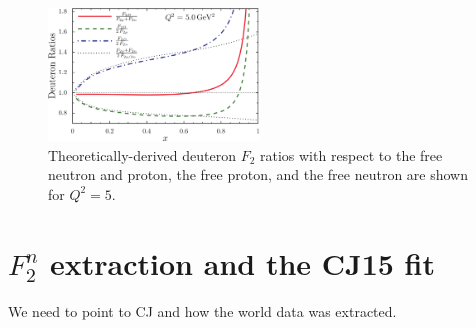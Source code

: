 \documentclass[oneside]{article}
\begin{document}
\begin{figure}[H]
  \centering
      	  \includegraphics[width=0.5\textwidth]{plots/deut_ratio_theory.png}
 	 \caption[Theoretically-derived deuteron $F_2$ ratios with respect to the free nucleons]{Theoretically-derived deuteron $F_2$ ratios with respect to the free neutron and proton, the free proton, and the free neutron are shown for $Q^2=5$.}
  \label{fig:deut_theory}
 \end{figure}  
  
\section{$F_2^n$ extraction and the CJ15 fit}

We need to point to CJ and how the world data was extracted. 
\end{document}
